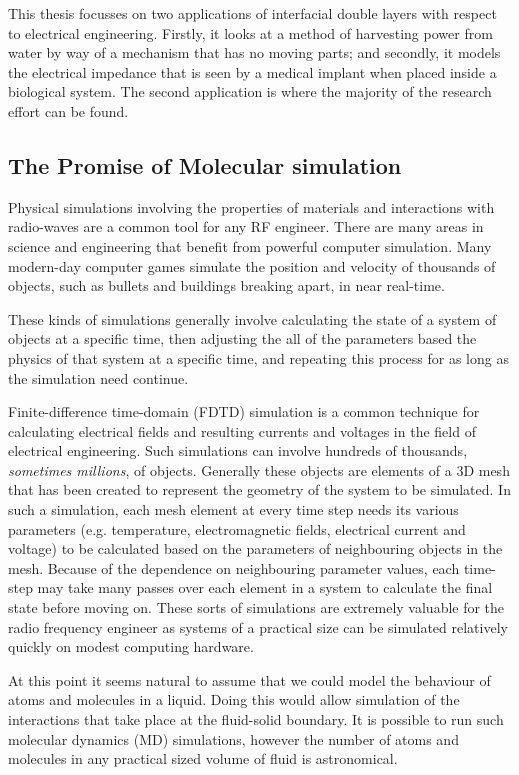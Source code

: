 This thesis focusses on two applications of interfacial double layers with respect to electrical engineering. Firstly, it looks at a method of harvesting power from water by way of a mechanism that has no moving parts; and secondly, it models the electrical impedance that is seen by a medical implant when placed inside a biological system. The second application is where the majority of the research effort can be found.

\subsection{The Promise of Molecular simulation}
Physical simulations involving the properties of materials and interactions with radio-waves are a common tool for any RF engineer. There are many areas in science and engineering that benefit from powerful computer simulation. Many modern-day computer games simulate the position and velocity of thousands of objects, such as bullets and buildings breaking apart, in near real-time.

These kinds of simulations generally involve calculating the state of a system of objects at a specific time, then adjusting the all of the parameters based the physics of that system at a specific time, and repeating this process for as long as the simulation need continue.

Finite-difference time-domain (FDTD) simulation is a common technique for calculating electrical fields and resulting currents and voltages in the field of electrical engineering. Such simulations can involve hundreds of thousands, \emph{sometimes millions}, of objects. Generally these objects are elements of a 3D mesh that has been created to represent the geometry of the system to be simulated. In such a simulation, each mesh element at every time step needs its various parameters (e.g. temperature, electromagnetic fields, electrical current and voltage) to be calculated based on the parameters of neighbouring objects in the mesh. Because of the dependence on neighbouring parameter values, each time-step may take many passes over each element in a system to calculate the final state before moving on. These sorts of simulations are extremely valuable for the radio frequency engineer as systems of a practical size can be simulated relatively quickly on modest computing hardware.

At this point it seems natural to assume that we could model the behaviour of atoms and molecules in a liquid. Doing this would allow simulation of the interactions that take place at the fluid-solid boundary. It is possible to run such molecular dynamics (MD) simulations, however the number of atoms and molecules in any practical sized volume of fluid is astronomical.

